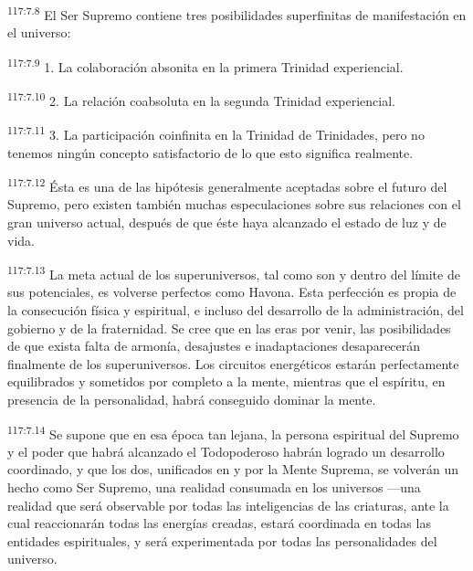 \documentclass[twoside, 11pt]{book}
\begin{document}
\par
\textsuperscript{117:7.8} El Ser Supremo contiene tres posibilidades superfinitas de manifestación en el universo:

\par
\textsuperscript{117:7.9} 1. La colaboración absonita en la primera Trinidad experiencial.

\par
\textsuperscript{117:7.10} 2. La relación coabsoluta en la segunda Trinidad experiencial.

\par
\textsuperscript{117:7.11} 3. La participación coinfinita en la Trinidad de Trinidades, pero no tenemos ningún concepto satisfactorio de lo que esto significa realmente.

\par
\textsuperscript{117:7.12} Ésta es una de las hipótesis generalmente aceptadas sobre el futuro del Supremo, pero existen también muchas especulaciones sobre sus relaciones con el gran universo actual, después de que éste haya alcanzado el estado de luz y de vida.

\par
\textsuperscript{117:7.13} La meta actual de los superuniversos, tal como son y dentro del límite de sus potenciales, es volverse perfectos como Havona. Esta perfección es propia de la consecución física y espiritual, e incluso del desarrollo de la administración, del gobierno y de la fraternidad. Se cree que en las eras por venir, las posibilidades de que exista falta de armonía, desajustes e inadaptaciones desaparecerán finalmente de los superuniversos. Los circuitos energéticos estarán perfectamente equilibrados y sometidos por completo a la mente, mientras que el espíritu, en presencia de la personalidad, habrá conseguido dominar la mente.

\par
\textsuperscript{117:7.14} Se supone que en esa época tan lejana, la persona espiritual del Supremo y el poder que habrá alcanzado el Todopoderoso habrán logrado un desarrollo coordinado, y que los dos, unificados en y por la Mente Suprema, se volverán un hecho como Ser Supremo, una realidad consumada en los universos ---una realidad que será observable por todas las inteligencias de las criaturas, ante la cual reaccionarán todas las energías creadas, estará coordinada en todas las entidades espirituales, y será experimentada por todas las personalidades del universo.
\end{document}
